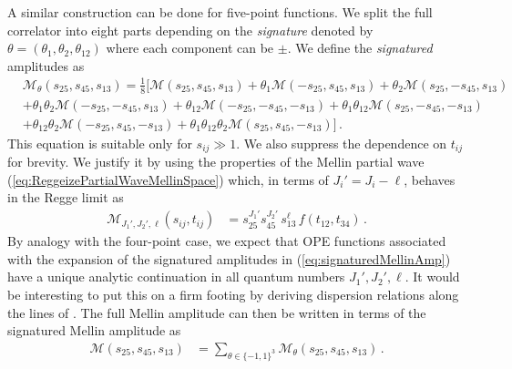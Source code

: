 A similar construction can be done for five-point functions.
We split the full correlator into eight parts depending on the \emph{signature} denoted by $ \mathbb{\theta} = (\theta_1,\theta_2,\theta_{12}) $ where each component can be $\pm$.
We define the  \textit{signatured} amplitudes as
\begin{align}
   & \mathcal{M}_{\theta}(s_{25},s_{45},s_{13})
  =
  \frac{1}{8}
  \big[
    \mathcal{M}(s_{25},s_{45},s_{13})
    +
    \theta_1
    \mathcal{M}(-s_{25},s_{45},s_{13})
    +
    \theta_{2}
    \mathcal{M}(s_{25},-s_{45},s_{13})
  \nonumber                                     \\
   &
    +
    \theta_1 \theta_{2}
    \mathcal{M}(-s_{25},-s_{45},s_{13})
    +
    \theta_{12}
    \mathcal{M}(-s_{25},-s_{45},-s_{13})
    +
    \theta_1 \theta_{12}
    \mathcal{M}(s_{25},-s_{45},-s_{13})
    \nonumber
  \\
   &
    +
    \theta_{12} \theta_{2}
    \mathcal{M}(-s_{25},s_{45},-s_{13})
    +
    \theta_1 \theta_{12} \theta_{2}
    \mathcal{M}(s_{25},s_{45},-s_{13})
    \big]
  \,.
  \label{eq:signaturedMellinAmp}
\end{align}
This equation is suitable only for $s_{ij} \gg 1$.
We also suppress the dependence on $ t_{ij} $ for brevity.
We justify it by using the properties of the Mellin partial wave (\ref{eq:ReggeizePartialWaveMellinSpace})  which,
in terms of $ J_i'=J_i-\ell $,  behaves in the  Regge limit as
\begin{align}
  \mathcal{M}_{J_1',J_2',\ell}(s_{ij},t_{ij}) & = s_{25}^{J_1'}s_{45}^{J_2'} \, s_{13}^{\ell}\, f(t_{12},t_{34})\,.
\end{align}
By analogy with the four-point case, we expect that OPE functions associated with the expansion of the signatured amplitudes in
(\ref{eq:signaturedMellinAmp}) have a unique analytic continuation in all quantum numbers $J_1',J_2',\ell$.
It would be interesting to put this on a firm footing by deriving dispersion relations along the lines of \cite{Caron-Huot:2017vep}.
The full Mellin amplitude can then be written in terms of the signatured Mellin amplitude as
\begin{align}
  \label{eq:fullMellinFromSignature}
  \mathcal{M}(s_{25},s_{45},s_{13} ) & = \sum_{\theta \in \{ -1,1 \}^{3}} \mathcal{M}_{\theta} (s_{25},s_{45},s_{13} )
  \,.
\end{align}

